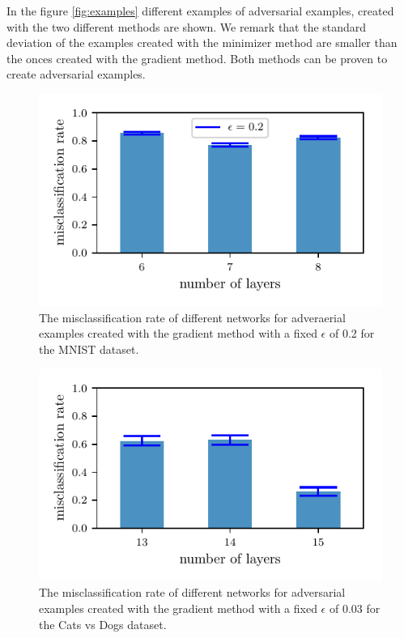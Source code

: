 \documentclass[%
 reprint,
 amsmath,amssymb,
 aps,
]{revtex4-1}
\begin{document}
In the figure \ref{fig:examples} different examples of adversarial examples, created with the two different methods are shown. We remark that the standard deviation of the examples created with the minimizer method are smaller than the onces created with the gradient method. Both methods can be proven to create adversarial examples.\\

\begin{figure}
\centering
\showthe\columnwidth
\includegraphics[width = 1\linewidth]{figures/mnist_grad_misclassificationrate.pdf}
\caption{The misclassification rate of different networks for adveraerial examples created with the gradient method with a fixed $\epsilon$ of 0.2 for the MNIST dataset.}
\label{fig:comp_grad_mnist}
\end{figure}

\begin{figure}
\centering
\showthe\columnwidth
\includegraphics[width = 1\linewidth]{figures/cvd_grad_misclassificationrate.pdf}
\caption{The misclassification rate of different networks for adversarial examples created with the gradient method with a fixed $\epsilon$ of 0.03 for the Cats vs Dogs dataset.}
\label{fig:comp_grad_cats_vs_dogs}
\end{figure}
\end{document}
